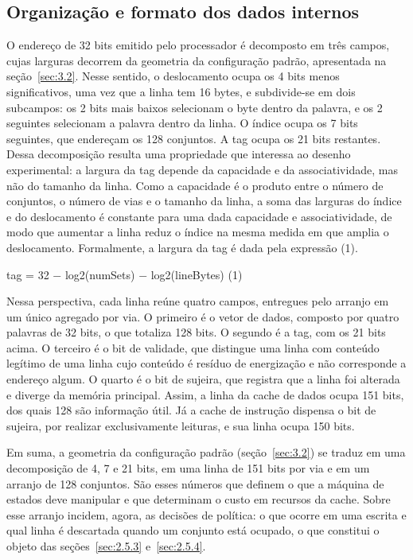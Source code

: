 \subsection{Organização e formato dos dados internos}\label{sec:2.5.2}

O endereço de 32 bits emitido pelo processador é decomposto em três campos, cujas larguras decorrem da geometria da configuração padrão, apresentada na seção~\ref{sec:3.2}. Nesse sentido, o deslocamento ocupa os 4 bits menos significativos, uma vez que a linha tem 16 bytes, e subdivide-se em dois subcampos: os 2 bits mais baixos selecionam o byte dentro da palavra, e os 2 seguintes selecionam a palavra dentro da linha. O índice ocupa os 7 bits seguintes, que endereçam os 128 conjuntos. A tag ocupa os 21 bits restantes. Dessa decomposição resulta uma propriedade que interessa ao desenho experimental: a largura da tag depende da capacidade e da associatividade, mas não do tamanho da linha. Como a capacidade é o produto entre o número de conjuntos, o número de vias e o tamanho da linha, a soma das larguras do índice e do deslocamento é constante para uma dada capacidade e associatividade, de modo que aumentar a linha reduz o índice na mesma medida em que amplia o deslocamento. Formalmente, a largura da tag é dada pela expressão (1).

tag = 32 $-$ log2(numSets) $-$ log2(lineBytes) (1)

Nessa perspectiva, cada linha reúne quatro campos, entregues pelo arranjo em um único agregado por via. O primeiro é o vetor de dados, composto por quatro palavras de 32 bits, o que totaliza 128 bits. O segundo é a tag, com os 21 bits acima. O terceiro é o bit de validade, que distingue uma linha com conteúdo legítimo de uma linha cujo conteúdo é resíduo de energização e não corresponde a endereço algum. O quarto é o bit de sujeira, que registra que a linha foi alterada e diverge da memória principal. Assim, a linha da cache de dados ocupa 151 bits, dos quais 128 são informação útil. Já a cache de instrução dispensa o bit de sujeira, por realizar exclusivamente leituras, e sua linha ocupa 150 bits.

Em suma, a geometria da configuração padrão (seção~\ref{sec:3.2}) se traduz em uma decomposição de 4, 7 e 21 bits, em uma linha de 151 bits por via e em um arranjo de 128 conjuntos. São esses números que definem o que a máquina de estados deve manipular e que determinam o custo em recursos da cache. Sobre esse arranjo incidem, agora, as decisões de política: o que ocorre em uma escrita e qual linha é descartada quando um conjunto está ocupado, o que constitui o objeto das seções~\ref{sec:2.5.3} e~\ref{sec:2.5.4}.

